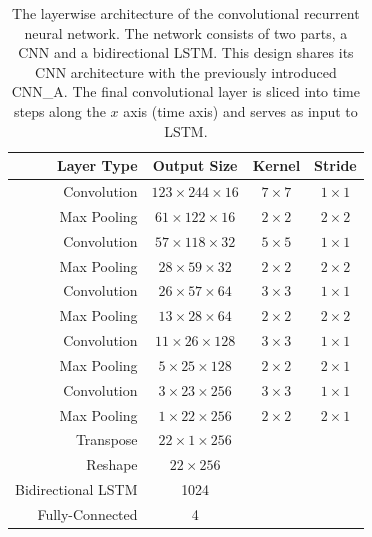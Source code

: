  \begin{table}[tp]
  \centering
  \begin{tabu}{rccc}
  \toprule
\textbf{Layer Type}       & \textbf{Output Size}    & \textbf{Kernel} & \textbf{Stride}  \\ \midrule
Convolution               & $123 \times 244 \times 16$  & $7 \times 7$    & $1 \times 1$    \\
Max Pooling               & $61 \times 122 \times 16$   & $2 \times 2$    & $2 \times 2$    \\
Convolution               & $57 \times 118 \times 32$   & $5 \times 5$    & $1 \times 1$    \\
Max Pooling               & $28 \times 59 \times 32$   & $2 \times 2$    & $2 \times 2$    \\
Convolution               & $26 \times 57 \times 64$   & $3 \times 3$    & $1 \times 1$    \\
Max Pooling               & $13 \times 28 \times 64$    & $2 \times 2$    & $2 \times 2$    \\
Convolution               & $11 \times 26 \times 128$   & $3 \times 3$    & $1 \times 1$    \\
Max Pooling               & $5 \times 25 \times 128$    & $2 \times 2$    & $2 \times 1$    \\
Convolution               & $3 \times 23 \times 256$    & $3 \times 3$    & $1 \times 1$    \\
Max Pooling               & $1 \times 22 \times 256$    & $2 \times 2$    & $2 \times 1$    \\
Transpose                 & $22 \times 1 \times 256$    &        &         \\
Reshape                   & $22 \times 256$           &        &         \\
Bidirectional LSTM & 1024                    &        &         \\
Fully-Connected    & 4                       &        &         \\
  \bottomrule
  \end{tabu}
  \caption{The layerwise architecture of the convolutional recurrent neural network. The network consists of two parts, a CNN and a bidirectional LSTM. This design shares its CNN architecture with the previously introduced CNN\_A. The final convolutional layer is sliced into time steps along the $x$ axis (time axis) and serves as input to LSTM.}
  \label{tab:layers_CRNN}
 \end{table}

